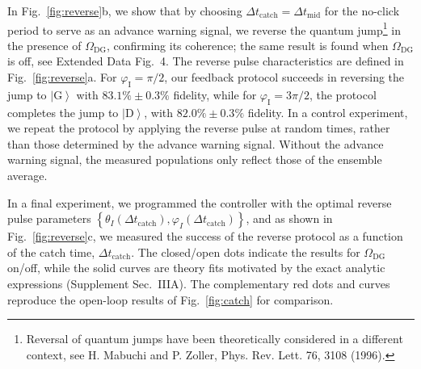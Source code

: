 \documentclass[
	 			preprint,     		superscriptaddress, 																longbibliography,
		amsmath, amssymb,
		aps,  prb,   		floatfix,
		linenumbers     
	]{revtex4-1}
\newcommand{\ket}[1]{\left|#1\right>}
\begin{document}
In Fig.~\ref{fig:reverse}b,  we show that by choosing $\Delta t_{\operatorname{catch}} = \Delta  t_\mathrm{mid}$ for the no-click period to serve as an advance warning signal, we reverse the quantum jump\footnote{
Reversal of quantum jumps have been theoretically considered in a different context, see H. Mabuchi and P. Zoller, Phys. Rev. Lett. 76, 3108 (1996).}
in the presence of  $\Omega_\mathrm{DG}$, confirming its coherence; the same result is found when $\Omega_\mathrm{DG}$ is off,  see Extended Data Fig.~4.
The reverse pulse characteristics are defined in Fig.~\ref{fig:reverse}a. 
For $\varphi_\mathrm{I} = \pi/2$, our feedback protocol succeeds in reversing the jump to $\ket{\mathrm{G}}$ with  $83.1\%\pm0.3\%$ fidelity, while for $\varphi_\mathrm{I} = 3\pi/2$, the protocol completes the jump to $\ket{\mathrm{D}}$, with  $82.0\%\pm0.3\%$ fidelity. 
In a control experiment, we repeat the protocol by applying the reverse pulse at random times, rather than those determined by the advance warning signal. 
Without the advance warning signal, the measured populations only reflect those of the ensemble average.




In a final experiment, we programmed the controller with the optimal reverse pulse parameters $\left\{\theta_{I}\left(\Delta  t_{\mathrm{catch}}\right),\varphi_{I}\left(\Delta  t_{\mathrm{catch}}\right)\right\}$, and as shown in Fig.~\ref{fig:reverse}c, we measured the success of the reverse protocol as a function of the catch time, $\Delta t_\mathrm{catch}$.
The closed/open dots indicate the results for $\Omega_\mathrm{DG}$ on/off, while the  solid curves are theory fits motivated by the exact analytic expressions (Supplement Sec.~IIIA).
The complementary red dots and curves reproduce the open-loop results of Fig.~\ref{fig:catch} for comparison. 
\end{document}
